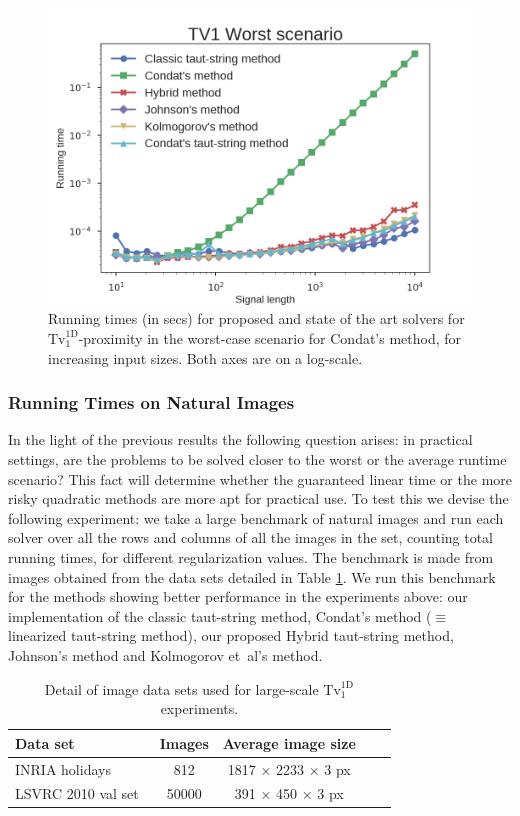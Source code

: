 \documentclass[twoside,11pt]{article}
\def\abovestrut#1{\rule[0in]{0in}{#1}\ignorespaces}
\def\belowstrut#1{\rule[-#1]{0in}{#1}\ignorespaces}
\def\abovespace{\abovestrut{0.20in}}
\def\belowspace{\belowstrut{0.10in}}
\newcommand{\tvell}{\text{Tv}}
\newcommand{\oned}{\text{1D}}
\numberwithin{equation}{section}
\numberwithin{theorem}{section}
\begin{document}
\begin{figure}[ht]
  \centering
  \includegraphics[width = \textwidth]{TV1worst}
  \caption{Running times (in secs) for proposed and state of the art solvers for $\tvell_1^{\oned}$-proximity in the worst-case scenario for Condat's method, for increasing input sizes. Both axes are on a log-scale.
   }   \label{fig:tv1worst}
\end{figure}

\subsubsection{Running Times on Natural Images}

In the light of the previous results the following question arises: in practical settings, are the problems to be solved closer to the worst or the average runtime scenario? This fact will determine whether the guaranteed linear time or the more risky quadratic methods are more apt for practical use. To test this we devise the following experiment: we take a large benchmark of natural images and run each solver over all the rows and columns of all the images in the set, counting total running times, for different regularization values. The benchmark is made from images obtained from the data sets detailed in Table \ref{tab:imagedatasetsTVL1}. We run this benchmark for the methods showing better performance in the experiments above: our implementation of the classic taut-string method, Condat's method ($\equiv$ linearized taut-string method), our proposed Hybrid taut-string method, Johnson's method and Kolmogorov et~al's method.

\begin{table}[t]
\centering
\begin{tabular}{lcccc}
\hline
\abovespace\belowspace
 Data set & Images & Average image size \\
\hline
\abovespace
INRIA holidays~\citep{INRIAholidays} & 812 & 1817 $\times$ 2233 $\times$ 3 px\\
\belowspace
LSVRC 2010 val set~\citep{Imagenet} & 50000 & 391 $\times$ 450 $\times$ 3 px\\
\hline
\end{tabular}
\caption{Detail of image data sets used for large-scale $\tvell_1^{\oned}$ experiments.
\label{tab:imagedatasetsTVL1}
}
\end{table}
\end{document}
